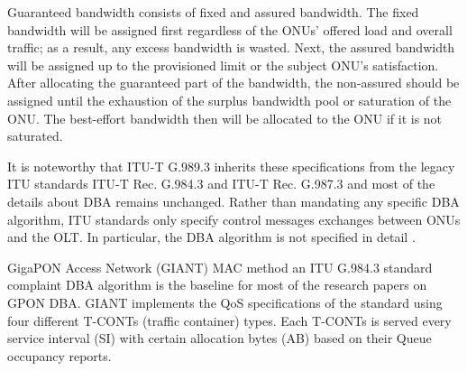 Guaranteed bandwidth consists of fixed and assured bandwidth. The fixed bandwidth will be assigned first regardless of the \acp{ONU}' offered load and overall traffic; as a result, any excess bandwidth is wasted. Next, the assured bandwidth will be assigned up to the provisioned limit or the subject \ac{ONU}'s satisfaction. After allocating the guaranteed part of the bandwidth, the non-assured should be assigned until the exhaustion of the surplus bandwidth pool or saturation of the \ac{ONU}. The best-effort bandwidth then will be allocated to the \ac{ONU} if it is not saturated.



It is noteworthy that ITU-T G.989.3 \cite{ITU_g.989.3_nodate} inherits these specifications from the legacy \ac{ITU} standards ITU-T Rec. G.984.3 \cite{itu984} and ITU-T Rec. G.987.3 \cite{itu987} and most of the details about \ac{DBA} remains unchanged. Rather than mandating any specific \ac{DBA} algorithm, \ac{ITU} standards only specify control messages exchanges between \ac{ONU}s and the OLT. In particular, the \ac{DBA} algorithm is not specified in detail \cite{7333289}.


GigaPON Access Network (GIANT) \ac{MAC} method \cite{DAC:DAC761,Angelopoulos2004,1267106} an \ac{ITU} G.984.3 \cite{itu984} standard complaint \ac{DBA} algorithm is the baseline for most of the research papers on \ac{GPON} \ac{DBA}. GIANT implements the \ac{QoS} specifications of the standard using four different \acp{T-CONT} (traffic container) types. Each \acp{T-CONT} is served every service interval (SI) with certain allocation bytes (AB) based on their Queue occupancy reports.

